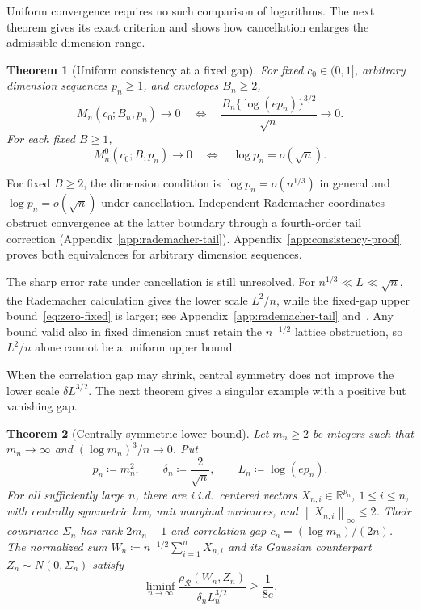 \documentclass[11pt,letterpaper]{article}
\newtheorem{theorem}{Theorem}
\theoremstyle{remark}
\newcommand{\R}{\mathbb R}
\newcommand{\norm}[1]{\left\lVert#1\right\rVert}
\newcommand{\rh}{\rho_{\mathcal R}}
\begin{document}
Uniform convergence requires no such comparison of logarithms. The
next theorem gives its exact criterion and shows how cancellation
enlarges the admissible dimension range.
\begin{theorem}[Uniform consistency at a fixed gap]
\label{opt:consistency}
For fixed \(c_0\in(0,1]\), arbitrary dimension sequences \(p_n\ge1\),
and envelopes \(B_n\ge2\),
\begin{equation}
 M_n(c_0;B_n,p_n)\longrightarrow0
 \quad\Longleftrightarrow\quad
 \frac{B_n\{\log(ep_n)\}^{3/2}}{\sqrt n}\longrightarrow0.
 \label{opt:consistency-iff}
\end{equation}
For each fixed \(B\ge1\),
\[
 M_n^0(c_0;B,p_n)\longrightarrow0
 \quad\Longleftrightarrow\quad \log p_n=o(\sqrt n).
\]
\end{theorem}
For fixed \(B\ge2\), the dimension condition is
\(\log p_n=o(n^{1/3})\) in general and \(\log p_n=o(\sqrt n)\)
under cancellation. Independent Rademacher coordinates obstruct
convergence at the latter boundary through a fourth-order tail
correction (Appendix~\ref{app:rademacher-tail}).
Appendix~\ref{app:consistency-proof} proves both equivalences for
arbitrary dimension sequences.

The sharp error rate under cancellation is still unresolved. For
\(n^{1/3}\ll L\ll\sqrt n\), the Rademacher calculation gives the
lower scale \(L^2/n\), while the fixed-gap upper
bound~\eqref{eq:zero-fixed} is larger; see
Appendix~\ref{app:rademacher-tail} and~\cite[Proposition~4.1]{CCK}.
Any bound valid also in fixed dimension must retain the
\(n^{-1/2}\) lattice obstruction, so \(L^2/n\) alone cannot be a
uniform upper bound.

When the correlation gap may shrink, central symmetry does not improve
the lower scale \(\delta L^{3/2}\). The next theorem gives a singular
example with a positive but vanishing gap.
\begin{theorem}[Centrally symmetric lower bound]\label{opt:symmetric-lower}
Let \(m_n\ge2\) be integers such that \(m_n\to\infty\) and
\((\log m_n)^3/n\to0\). Put
\[
 p_n\coloneqq m_n^2,\qquad \delta_n\coloneqq\frac2{\sqrt n},
 \qquad L_n\coloneqq\log(ep_n).
\]
For all sufficiently large \(n\), there are i.i.d.\ centered vectors
\(X_{n,i}\in\R^{p_n}\), \(1\le i\le n\), with centrally symmetric
law, unit marginal variances, and \(\norm{X_{n,i}}_\infty\le2\).
Their covariance \(\Sigma_n\) has rank \(2m_n-1\) and correlation
gap \(c_n=(\log m_n)/(2n)\). The normalized sum
\(W_n\coloneqq n^{-1/2}\sum_{i=1}^nX_{n,i}\) and its Gaussian
counterpart \(Z_n\sim N(0,\Sigma_n)\) satisfy
\[
 \liminf_{n\to\infty}
 \frac{\rh(W_n,Z_n)}{\delta_nL_n^{3/2}}\ge\frac1{8e}.
\]
\end{theorem}
\end{document}

